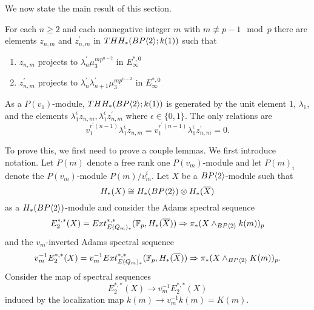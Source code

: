 We now state the main result of this section.
\begin{thm}\label{mod p v_2}
For each $n \ge 2$ and each nonnegative integer $m$ with $m \not\equiv p - 1 \mod{p}$ there are elements $z_{n,m}$ and $z^{\prime}_{n,m}$ in $THH_*(BP\langle 2 \rangle;k(1))$ such that
\begin{enumerate} 
\item $z_{n,m}$ projects to $\lambda^{\prime}_n\mu_3^{mp^{n-2}}$ in $E_{\infty}^{*,0}$
\item $z_{n,m}^{\prime}$ projects to $\lambda^{\prime}_n\lambda^{\prime}_{n+1}\mu_3^{mp^{n-2}}$ in $E_{\infty}^{*,0}$
\end{enumerate}
 As a $P(v_1)$-module, $THH_*(BP\langle 2 \rangle;k(1))$ is generated by the unit element
$1$, $\lambda_1$, and the elements $\lambda_1^{\epsilon}z_{n,m},\lambda_1^{\epsilon}z_{n,m}^{\prime}$ where $\epsilon\in\{0,1\}$. The only relations are
\[v_1^{r^{\prime}(n-1)}\lambda_1^{\epsilon}z_{n,m}=v_1^{r^{\prime}(n-1)}\lambda_1^{\epsilon}z_{n,m}^{\prime}=0.\]
\end{thm}
To prove this, we first need to prove a couple lemmas. We first introduce notation. Let $P(m)$ denote a free rank one $P(v_m)$-module and let $P(m)_i$ denote the $P(v_m)$-module $P(m)/v_m^i$. 
Let $X$ be a $BP\langle 2 \rangle$-module such that 
\[H_*(X)\cong H_*(BP\langle 2 \rangle)\otimes H_*(\overline{X})\] 
as a $H_*(BP\langle 2 \rangle)$-module and consider the Adams spectral sequence
\begin{equation}\label{ASSX} E_2^{*,*}(X)=Ext_{E(Q_m)_*}^{*,*}(\mathbb{F}_p,H_*(\overline{X}))\Rightarrow \pi_*(X\wedge_{BP\langle 2 \rangle}k(m))_p\end{equation}
and the $v_m$-inverted Adams spectral sequence 
\begin{equation}\label{v2invertASSX} v_m^{-1}E_2^{*,*}(X)=v_m^{-1}Ext_{E(Q_m)_*}^{*,*}(\mathbb{F}_p,H_*(\overline{X})) \Rightarrow \pi_*(X\wedge_{BP\langle 2 \rangle}K(m))_p.\end{equation}
Consider the map of spectral sequences 
\[ E_2^{*,*}(X) \longrightarrow v_m^{-1}E_2^{*,*}(X)\]
induced by the localization map $k(m)\to v_m^{-1}k(m)=K(m).$ 

